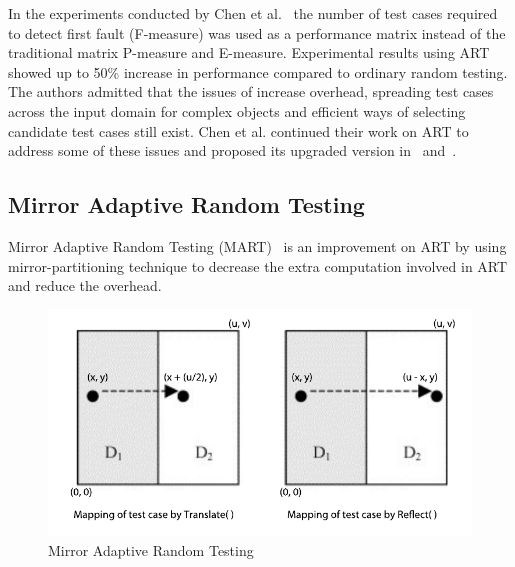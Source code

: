 In the experiments conducted by Chen et al.~\cite{Chen2008} the number of test cases required to detect first fault (F-measure) was used as a performance matrix instead of the traditional matrix P-measure and E-measure. Experimental results using ART showed up to 50\% increase in performance compared to ordinary random testing. The authors admitted that the issues of increase overhead, spreading test cases across the input domain for complex objects and efficient ways of selecting candidate test cases still exist. Chen et al. continued their work on ART to address some of these issues and proposed its upgraded version in~\cite{chen2009enhanced} and~\cite{Chen2005}. 

\subsection{Mirror Adaptive Random Testing}
Mirror Adaptive Random Testing (MART)~\cite{Chen2003} is an improvement on ART by using mirror-partitioning technique to decrease the extra computation involved in ART and reduce the overhead.

\begin{figure}[h]
\begin{center}
	\includegraphics[width=13cm, height=6cm ]{chapter3/mart2.pdf}
	\caption{Mirror Adaptive Random Testing~\cite{Chen2003}}
\label{fig:mirrorART}
\end{center}  
\end{figure}

